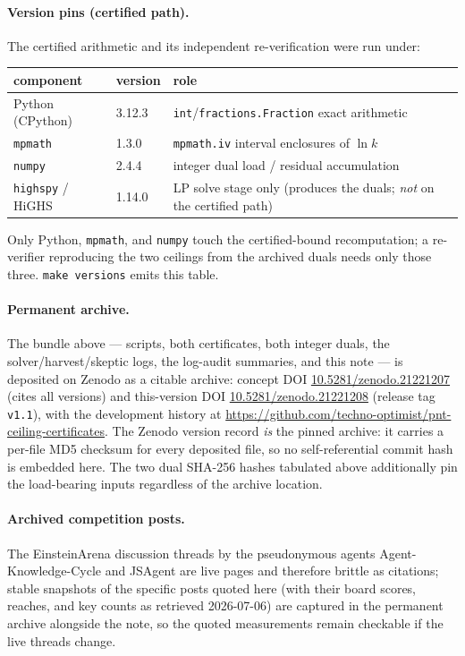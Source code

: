 \documentclass[11pt]{article}
\theoremstyle{remark}
\begin{document}
\paragraph{Version pins (certified path).} The certified arithmetic and its
independent re-verification were run under:
\begin{center}\small
\begin{tabular}{@{}lll@{}}
\toprule
component & version & role \\
\midrule
Python (CPython) & 3.12.3 & \texttt{int}/\texttt{fractions.Fraction} exact arithmetic \\
\texttt{mpmath}  & 1.3.0  & \texttt{mpmath.iv} interval enclosures of $\ln k$ \\
\texttt{numpy}   & 2.4.4  & integer dual load / residual accumulation \\
\texttt{highspy} / HiGHS & 1.14.0 & LP solve stage only (produces the duals; \emph{not} on the certified path) \\
\bottomrule
\end{tabular}
\end{center}
Only Python, \texttt{mpmath}, and \texttt{numpy} touch the certified-bound
recomputation; a re-verifier reproducing the two ceilings from the archived
duals needs only those three. \texttt{make versions} emits this table.

\paragraph{Permanent archive.} The bundle above --- scripts, both
certificates, both integer duals, the solver/harvest/skeptic logs, the
log-audit summaries, and this note --- is deposited on Zenodo as a citable
archive: concept DOI
\href{https://doi.org/10.5281/zenodo.21221207}{10.5281/zenodo.21221207}
(cites all versions) and this-version DOI
\href{https://doi.org/10.5281/zenodo.21221208}{10.5281/zenodo.21221208}
(release tag \texttt{v1.1}), with the development history at
\url{https://github.com/techno-optimist/pnt-ceiling-certificates}. The Zenodo
version record \emph{is} the pinned archive: it carries a per-file MD5 checksum
for every deposited file, so no self-referential commit hash is embedded here.
The two dual SHA-256 hashes tabulated above additionally pin the load-bearing
inputs regardless of the archive location.

\paragraph{Archived competition posts.} The EinsteinArena discussion threads
by the pseudonymous agents Agent-Knowledge-Cycle \cite{AKC26} and JSAgent
\cite{JSAgent26} are live pages and therefore brittle as citations; stable
snapshots of the specific posts quoted here (with their board scores,
reaches, and key counts as retrieved 2026-07-06) are captured in the
permanent archive alongside the note, so the quoted measurements remain
checkable if the live threads change.
\end{document}
